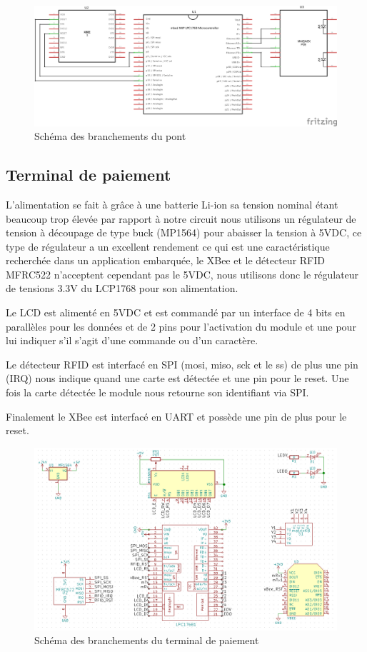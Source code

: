 	\clearpage

	\begin{figure}[t]
		\includegraphics[width=\textwidth]{Pictures/Branchements/Pont}
		\caption{Schéma des branchements du pont}
		\label{fig.branchPont}
	\end{figure}

	\subsection{Terminal de paiement}
	L’alimentation se fait à grâce à une batterie Li-ion sa tension nominal étant beaucoup trop élevée par rapport à notre circuit nous utilisons un régulateur de tension à découpage de type buck (MP1564) pour abaisser la tension à 5VDC, ce type de régulateur a un excellent rendement ce qui est une caractéristique recherchée dans un application embarquée, le XBee et le détecteur RFID MFRC522 n’acceptent cependant pas le 5VDC, nous utilisons donc le régulateur de tensions 3.3V du LCP1768  pour son alimentation. 

	Le LCD est alimenté en 5VDC et est commandé par un interface de 4 bits en parallèles pour les données et de 2 pins pour l’activation du module et une pour lui indiquer s’il s’agit d’une commande ou d’un caractère. 

	Le détecteur RFID est interfacé en SPI (mosi, miso, sck et le ss) de plus une pin (IRQ) nous indique quand une carte est détectée et une pin pour le reset. Une fois la carte détectée le module nous retourne son identifiant via SPI.

	Finalement le XBee est interfacé en UART et possède une pin de plus pour le reset.

	\begin{figure}[p]
		\includegraphics[width=\textwidth]{Pictures/Branchements/Terminal_Paiement}
		\caption{Schéma des branchements du terminal de paiement}
		\label{fig.branchPaiement}
	\end{figure}

